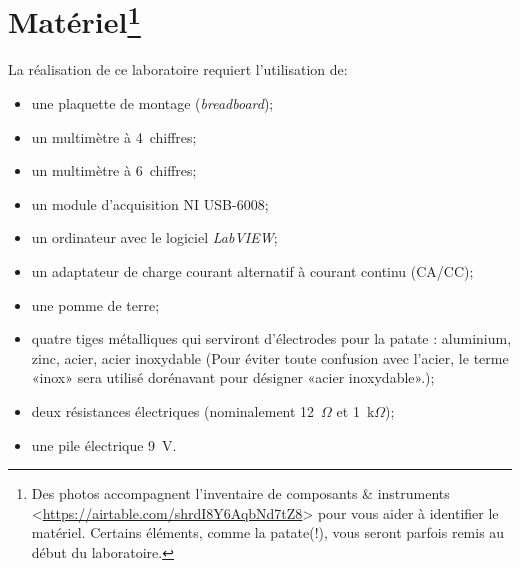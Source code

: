 \documentclass[canadien,12pt,oneside,letterpaper]{article}
\begin{document}


\section[Matériel]{Matériel\footnote{Des photos accompagnent l'inventaire de composants \& instruments <\url{https://airtable.com/shrdI8Y6AqbNd7tZ8}> pour vous aider à identifier le matériel. Certains éléments, comme la patate(!), vous seront parfois remis au début du laboratoire.}} \label{sec:mat}

\noindent La réalisation de ce laboratoire requiert l'utilisation de:
\vspace{1ex}
\begin{itemize} \itemsep5pt
\item une plaquette de montage (\textit{breadboard});
\item un multimètre à 4\textonehalf~chiffres;
\item un multimètre à 6\textonehalf~chiffres;
\item un module d'acquisition NI USB-6008;
\item un ordinateur avec le logiciel \textit{LabVIEW};
\item un adaptateur de charge courant alternatif à courant continu (CA/CC);
\item une pomme de terre;
\item quatre tiges métalliques qui serviront d'électrodes pour la patate : aluminium, zinc, acier, acier inoxydable (Pour éviter toute confusion avec l'acier, le terme «inox» sera utilisé dorénavant pour désigner «acier inoxydable».);
\item deux résistances électriques (nominalement 12~$\Omega$ et 1~k$\Omega$);
\item une pile électrique 9~V.
\end{itemize}
\end{document}
